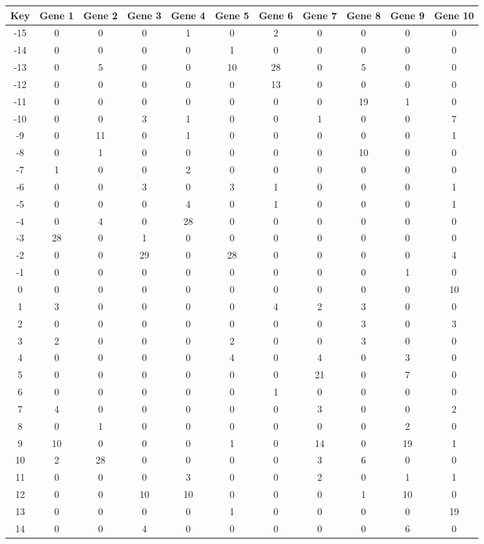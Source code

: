 \begin{tabular}{|c|c|c|c|c|c|c|c|c|c|c|}
\hline
Key & Gene 1 & Gene 2 & Gene 3 & Gene 4 & Gene 5 & Gene 6 & Gene 7 & Gene 8 & Gene 9 & Gene 10 \\
\hline
-15 & 0 & 0 & 0 & 1 & 0 & 2 & 0 & 0 & 0 & 0 \\
-14 & 0 & 0 & 0 & 0 & 1 & 0 & 0 & 0 & 0 & 0 \\
-13 & 0 & 5 & 0 & 0 & 10 & 28 & 0 & 5 & 0 & 0 \\
-12 & 0 & 0 & 0 & 0 & 0 & 13 & 0 & 0 & 0 & 0 \\
-11 & 0 & 0 & 0 & 0 & 0 & 0 & 0 & 19 & 1 & 0 \\
-10 & 0 & 0 & 3 & 1 & 0 & 0 & 1 & 0 & 0 & 7 \\
-9 & 0 & 11 & 0 & 1 & 0 & 0 & 0 & 0 & 0 & 1 \\
-8 & 0 & 1 & 0 & 0 & 0 & 0 & 0 & 10 & 0 & 0 \\
-7 & 1 & 0 & 0 & 2 & 0 & 0 & 0 & 0 & 0 & 0 \\
-6 & 0 & 0 & 3 & 0 & 3 & 1 & 0 & 0 & 0 & 1 \\
-5 & 0 & 0 & 0 & 4 & 0 & 1 & 0 & 0 & 0 & 1 \\
-4 & 0 & 4 & 0 & 28 & 0 & 0 & 0 & 0 & 0 & 0 \\
-3 & 28 & 0 & 1 & 0 & 0 & 0 & 0 & 0 & 0 & 0 \\
-2 & 0 & 0 & 29 & 0 & 28 & 0 & 0 & 0 & 0 & 4 \\
-1 & 0 & 0 & 0 & 0 & 0 & 0 & 0 & 0 & 1 & 0 \\
0 & 0 & 0 & 0 & 0 & 0 & 0 & 0 & 0 & 0 & 10 \\
1 & 3 & 0 & 0 & 0 & 0 & 4 & 2 & 3 & 0 & 0 \\
2 & 0 & 0 & 0 & 0 & 0 & 0 & 0 & 3 & 0 & 3 \\
3 & 2 & 0 & 0 & 0 & 2 & 0 & 0 & 3 & 0 & 0 \\
4 & 0 & 0 & 0 & 0 & 4 & 0 & 4 & 0 & 3 & 0 \\
5 & 0 & 0 & 0 & 0 & 0 & 0 & 21 & 0 & 7 & 0 \\
6 & 0 & 0 & 0 & 0 & 0 & 1 & 0 & 0 & 0 & 0 \\
7 & 4 & 0 & 0 & 0 & 0 & 0 & 3 & 0 & 0 & 2 \\
8 & 0 & 1 & 0 & 0 & 0 & 0 & 0 & 0 & 2 & 0 \\
9 & 10 & 0 & 0 & 0 & 1 & 0 & 14 & 0 & 19 & 1 \\
10 & 2 & 28 & 0 & 0 & 0 & 0 & 3 & 6 & 0 & 0 \\
11 & 0 & 0 & 0 & 3 & 0 & 0 & 2 & 0 & 1 & 1 \\
12 & 0 & 0 & 10 & 10 & 0 & 0 & 0 & 1 & 10 & 0 \\
13 & 0 & 0 & 0 & 0 & 1 & 0 & 0 & 0 & 0 & 19 \\
14 & 0 & 0 & 4 & 0 & 0 & 0 & 0 & 0 & 6 & 0 \\
\hline
\end{tabular}